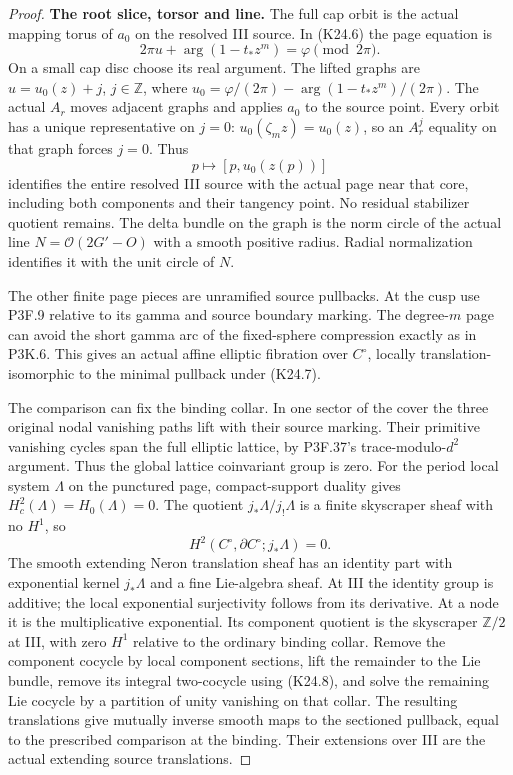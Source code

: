 \begin{proof}
\par\medskip\noindent\textbf{The root slice, torsor and line.}
The full cap orbit is the actual mapping torus of $a_0$ on
the resolved III source. In (K24.6) the page equation is
\[
 2\pi u+\arg(1-t_*z^m)=\varphi\pmod{2\pi}.
\]
On a small cap disc choose its real argument. The lifted
graphs are $u=u_0(z)+j$, $j\in\mathbb Z$, where
$u_0=\varphi/(2\pi)-\arg(1-t_*z^m)/(2\pi)$.
The actual $A_r$ moves adjacent graphs and applies $a_0$ to
the source point. Every orbit has a unique representative
on $j=0$: $u_0(\zeta_mz)=u_0(z)$, so an $A_r^j$ equality
on that graph forces $j=0$. Thus
\[
                         p\longmapsto[p,u_0(z(p))]
\]
identifies the entire resolved III source with the actual page
near that core, including both components and their tangency
point. No residual stabilizer quotient remains. The delta
bundle on the graph is the norm circle of the actual line
$N=\mathcal O(2G'-O)$ with a smooth positive radius. Radial
normalization identifies it with the unit circle of $N$.

The other finite page pieces are unramified source pullbacks.
At the cusp use P3F.9 relative to its gamma and source boundary
marking. The degree-$m$ page can avoid the short gamma arc of
the fixed-sphere compression exactly as in P3K.6. This gives
an actual affine elliptic fibration over $C^\circ$, locally
translation-isomorphic to the minimal pullback under (K24.7).

The comparison can fix the binding collar. In one sector of
the cover the three original nodal vanishing paths lift with
their source marking. Their primitive vanishing cycles span
the full elliptic lattice, by P3F.37's trace-modulo-$d^2$
argument. Thus the global lattice coinvariant group is zero.
For the period local system $\Lambda$ on the punctured page,
compact-support duality gives $H_c^2(\Lambda)=H_0(\Lambda)=0$.
The quotient $j_*\Lambda/j_!\Lambda$ is a finite skyscraper
sheaf with no $H^1$, so
\[
             H^2(C^\circ,\partial C^\circ;j_*\Lambda)=0. \tag{K24.8}
\]
The smooth extending Neron translation sheaf has an identity
part with exponential kernel $j_*\Lambda$ and a fine
Lie-algebra sheaf. At III the identity group is additive;
the local exponential surjectivity follows from its derivative.
At a node it is the multiplicative exponential. Its component
quotient is the skyscraper $\mathbb Z/2$ at III, with zero
$H^1$ relative to the ordinary binding collar. Remove the
component cocycle by local component sections, lift the remainder
to the Lie bundle, remove its integral two-cocycle using (K24.8),
and solve the remaining Lie cocycle by a partition of unity
vanishing on that collar. The resulting translations give
mutually inverse smooth maps to the sectioned pullback, equal
to the prescribed comparison at the binding. Their extensions
over III are the actual extending source translations.


\end{proof}
